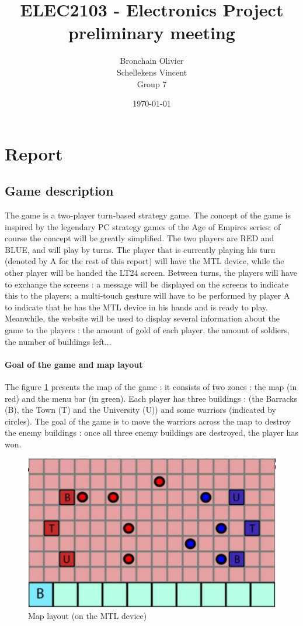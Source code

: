 \documentclass[10pt,a4paper]{article}
\title{ELEC2103 - Electronics Project preliminary meeting}
\author{Bronchain Olivier \\ Schellekens Vincent \\ Group 7}
\date{\today}
\begin{document}
\maketitle

\section{Report}
\subsection{Game description}
The game is a two-player turn-based strategy game. The concept of the game is inspired by the legendary PC strategy games of the Age of Empires series; of course the concept will be greatly simplified. The two players are RED and BLUE, and will play by turns. The player that is currently playing his turn (denoted by A for the rest of this report) will have the MTL device, while the other player will be handed the LT24 screen. Between turns, the players will have to exchange the screens : a message will be displayed on the screens to indicate this to the players; a multi-touch gesture will have to be performed by player A to indicate that he has the MTL device in his hands and is ready to play. Meanwhile, the website will be used to display several information about the game to the players : the amount of gold of each player, the amount of soldiers, the number of buildings left...

\paragraph{Goal of the game and map layout}
The figure \ref{coucou} presents the map of the game : it consists of two zones : the map (in red) and the menu bar (in green). Each player has three buildings : (the Barracks (B), the Town (T) and the University (U)) and some warriors (indicated by circles). The goal of the game is to move the warriors across the map to destroy the enemy buildings : once all three enemy buildings are destroyed, the player has won. 

\begin{figure}[h!]
    \centering
    \includegraphics[width = 0.5 \textwidth]{lol}
    \caption{Map layout (on the MTL device)}
    \label{coucou}
\end{figure}
\end{document}
